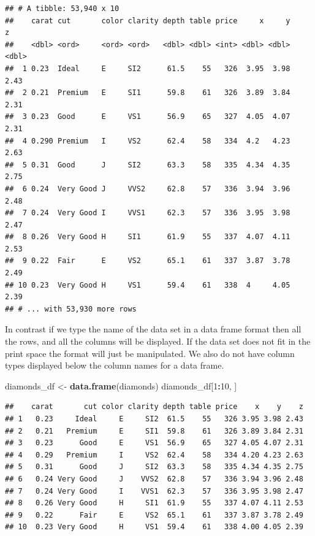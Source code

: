 \documentclass[
]{book}
\newenvironment{Shaded}{\begin{snugshade}}{\end{snugshade}}
\newcommand{\DecValTok}[1]{\textcolor[rgb]{0.00,0.00,0.81}{#1}}
\newcommand{\KeywordTok}[1]{\textcolor[rgb]{0.13,0.29,0.53}{\textbf{#1}}}
\newcommand{\NormalTok}[1]{#1}
\newcommand{\OperatorTok}[1]{\textcolor[rgb]{0.81,0.36,0.00}{\textbf{#1}}}
\newcommand{\StringTok}[1]{\textcolor[rgb]{0.31,0.60,0.02}{#1}}
\begin{document}
\begin{verbatim}
## # A tibble: 53,940 x 10
##    carat cut       color clarity depth table price     x     y     z
##    <dbl> <ord>     <ord> <ord>   <dbl> <dbl> <int> <dbl> <dbl> <dbl>
##  1 0.23  Ideal     E     SI2      61.5    55   326  3.95  3.98  2.43
##  2 0.21  Premium   E     SI1      59.8    61   326  3.89  3.84  2.31
##  3 0.23  Good      E     VS1      56.9    65   327  4.05  4.07  2.31
##  4 0.290 Premium   I     VS2      62.4    58   334  4.2   4.23  2.63
##  5 0.31  Good      J     SI2      63.3    58   335  4.34  4.35  2.75
##  6 0.24  Very Good J     VVS2     62.8    57   336  3.94  3.96  2.48
##  7 0.24  Very Good I     VVS1     62.3    57   336  3.95  3.98  2.47
##  8 0.26  Very Good H     SI1      61.9    55   337  4.07  4.11  2.53
##  9 0.22  Fair      E     VS2      65.1    61   337  3.87  3.78  2.49
## 10 0.23  Very Good H     VS1      59.4    61   338  4     4.05  2.39
## # ... with 53,930 more rows
\end{verbatim}

In contrast if we type the name of the data set in a data frame format then all the rows, and all the columns will be displayed. If the data set does not fit in the print space the format will just be manipulated. We also do not have column types displayed below the column names for a data frame.

\begin{Shaded}
\begin{Highlighting}[]
\NormalTok{diamonds_df <-}\StringTok{ }\KeywordTok{data.frame}\NormalTok{(diamonds)}
\NormalTok{diamonds_df[}\DecValTok{1}\OperatorTok{:}\DecValTok{10}\NormalTok{, ]}
\end{Highlighting}
\end{Shaded}

\begin{verbatim}
##    carat       cut color clarity depth table price    x    y    z
## 1   0.23     Ideal     E     SI2  61.5    55   326 3.95 3.98 2.43
## 2   0.21   Premium     E     SI1  59.8    61   326 3.89 3.84 2.31
## 3   0.23      Good     E     VS1  56.9    65   327 4.05 4.07 2.31
## 4   0.29   Premium     I     VS2  62.4    58   334 4.20 4.23 2.63
## 5   0.31      Good     J     SI2  63.3    58   335 4.34 4.35 2.75
## 6   0.24 Very Good     J    VVS2  62.8    57   336 3.94 3.96 2.48
## 7   0.24 Very Good     I    VVS1  62.3    57   336 3.95 3.98 2.47
## 8   0.26 Very Good     H     SI1  61.9    55   337 4.07 4.11 2.53
## 9   0.22      Fair     E     VS2  65.1    61   337 3.87 3.78 2.49
## 10  0.23 Very Good     H     VS1  59.4    61   338 4.00 4.05 2.39
\end{verbatim}
\end{document}
